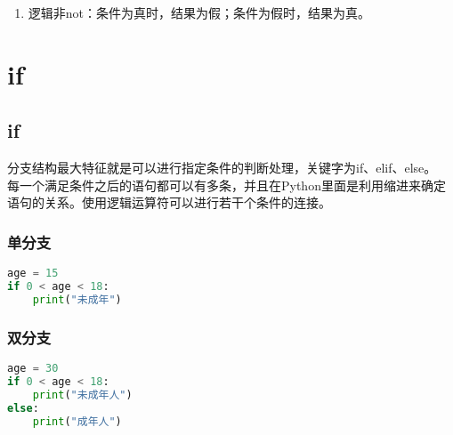 \begin{enumerate}
	\item 逻辑非not：条件为真时，结果为假；条件为假时，结果为真。
	      \begin{table}[H]
		      \centering
		      \caption{逻辑非}
	      \end{table}
\end{enumerate}

\newpage

\section{if}

\subsection{if}

分支结构最大特征就是可以进行指定条件的判断处理，关键字为if、elif、else。\\

每一个满足条件之后的语句都可以有多条，并且在Python里面是利用缩进来确定语句的关系。使用逻辑运算符可以进行若干个条件的连接。

\subsubsection{单分支}

\vspace{-1cm}

\begin{lstlisting}[language=Python]
age = 15
if 0 < age < 18:
    print("未成年")
\end{lstlisting}

\subsubsection{双分支}

\vspace{-1cm}

\begin{lstlisting}[language=Python]
age = 30
if 0 < age < 18:
    print("未成年人")
else:
    print("成年人")
\end{lstlisting}

